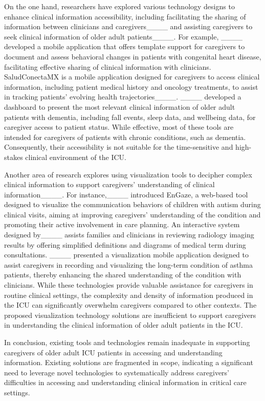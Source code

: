 On the one hand, researchers have explored various technology designs to enhance clinical information accessibility, including facilitating the sharing of information between clinicians and caregivers____ and assisting caregivers to seek clinical information of older adult patients____.
For example, ____ developed a mobile application that offers template support for caregivers to document and assess behavioral changes in patients with congenital heart disease, facilitating effective sharing of clinical information with clinicians. 
SaludConectaMX is a mobile application designed for caregivers to access clinical information, including patient medical history and oncology treatments, to assist in tracking patients' evolving health trajectories____.
____ developed a dashboard to present the most relevant clinical information of older adult patients with dementia, including fall events, sleep data, and wellbeing data, for caregiver access to patient status. 
While effective, most of these tools are intended for caregivers of patients with chronic conditions, such as dementia.
Consequently, their accessibility is not suitable for the time-sensitive and high-stakes clinical environment of the ICU.

Another area of research explores using visualization tools to decipher complex clinical information to support caregivers' understanding of clinical information____.
For instance,____ introduced EnGaze, a web-based tool designed to visualize the communication behaviors of children with autism during clinical visits, aiming at improving caregivers' understanding of the condition and promoting their active involvement in care planning.
An interactive system designed by____ assists families and clinicians in reviewing radiology imaging results by offering simplified definitions and diagrams of medical term during consultations.
____ presented a visualization mobile application designed to assist caregivers in recording and visualizing the long-term condition of asthma patients, thereby enhancing the shared understanding of the condition with clinicians.
While these technologies provide valuable assistance for caregivers in routine clinical settings, the complexity and density of information produced in the ICU can significantly overwhelm caregivers compared to other contexts.
The proposed visualization technology solutions are insufficient to support caregivers in understanding the clinical information of older adult patients in the ICU. 

In conclusion, existing tools and technologies remain inadequate in supporting caregivers of older adult ICU patients in accessing and understanding information.
Existing solutions are fragmented in scope, indicating a significant need to leverage novel technologies to systematically address caregivers' difficulties in accessing and understanding clinical information in critical care settings.



